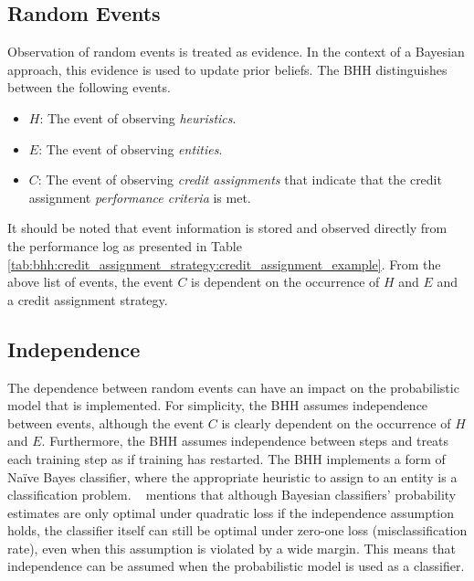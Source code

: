 \subsection{Random Events}
\label{sec:bhh:selection_mechanism:random_events}

Observation of random events is treated as evidence. In the context of a Bayesian approach, this evidence is used to update prior beliefs. The \acs{BHH} distinguishes between the following events.

\begin{itemize}
      \item \textbf{$H$}: The event of observing \textit{heuristics}.
      \item \textbf{$E$}: The event of observing \textit{entities}.
      \item \textbf{$C$}: The event of observing \textit{credit assignments} that indicate that the credit assignment \textit{performance criteria} is met.
\end{itemize}

It should be noted that event information is stored and observed directly from the performance log as presented in Table \ref{tab:bhh:credit_assignment_strategy:credit_assignment_example}. From the above list of events, the event $C$ is dependent on the occurrence of $H$ and $E$ and a credit assignment strategy.

\subsection{Independence}\label{sec:bhh:selection_mechanism:independence}

The dependence between random events can have an impact on the probabilistic model that is implemented. For simplicity, the \acs{BHH} assumes independence between events, although the event $C$ is clearly dependent on the occurrence of $H$ and $E$. Furthermore, the \acs{BHH} assumes independence between steps  and treats each training step as if training has restarted. The \acs{BHH} implements a form of Naïve Bayes classifier, where the appropriate heuristic to assign to an entity is a classification problem. \citeauthor{ref:domingos:1997}~\cite{ref:domingos:1997} mentions that although Bayesian classifiers’ probability estimates are only optimal under quadratic loss if the independence assumption holds, the classifier itself can still be optimal under zero-one loss (misclassification rate), even when this assumption is violated by a wide margin. This means that independence can be assumed when the probabilistic model is used as a classifier.

